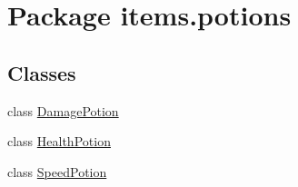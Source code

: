 \hypertarget{namespaceitems_1_1potions}{}\section{Package items.\+potions}
\label{namespaceitems_1_1potions}
\subsection*{Classes}
\begin{DoxyCompactItemize}
\item 
class \mbox{\hyperlink{classitems_1_1potions_1_1_damage_potion}{Damage\+Potion}}
\item 
class \mbox{\hyperlink{classitems_1_1potions_1_1_health_potion}{Health\+Potion}}
\item 
class \mbox{\hyperlink{classitems_1_1potions_1_1_speed_potion}{Speed\+Potion}}
\end{DoxyCompactItemize}
